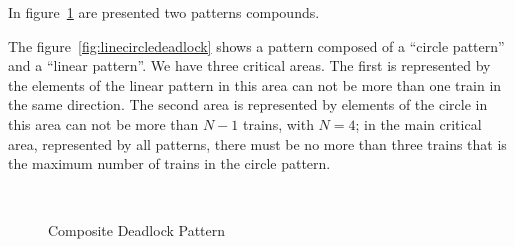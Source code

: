 \documentclass{ewic}
\begin{document}
In figure~\ref{fig:compdeadlockpattern} are presented two patterns compounds.


The figure~\ref{fig:linecircledeadlock}  shows a pattern composed of a ``circle pattern'' and a ``linear pattern''. We have three critical areas. The first is represented by the elements of the linear pattern in this area can not be more than one train in the same direction.  The second area is represented by elements of the circle in this area can not be more than $N-1$ trains, with $N=4$; in the main critical area, represented by all patterns,  there must be no more than three trains that is the maximum number of trains in the circle pattern.

\begin{figure}[!htp]
 \centering

 
 \\

\caption{Composite Deadlock Pattern}
 \label{fig:compdeadlockpattern}
 \end{figure}
\end{document}
